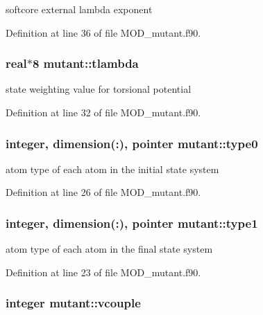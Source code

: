 softcore external lambda exponent 



Definition at line 36 of file M\-O\-D\-\_\-mutant.\-f90.

\hypertarget{classmutant_ad09b1660ee7cf2b19032e29646050709}{
\subsubsection[{tlambda}]{\setlength{\rightskip}{0pt plus 5cm}real$\ast$8 mutant\-::tlambda}}\label{classmutant_ad09b1660ee7cf2b19032e29646050709}


state weighting value for torsional potential 



Definition at line 32 of file M\-O\-D\-\_\-mutant.\-f90.

\hypertarget{classmutant_a6fc403c4284262ec13d260154dc672be}{
\subsubsection[{type0}]{\setlength{\rightskip}{0pt plus 5cm}integer, dimension(\-:), pointer mutant\-::type0}}\label{classmutant_a6fc403c4284262ec13d260154dc672be}


atom type of each atom in the initial state system 



Definition at line 26 of file M\-O\-D\-\_\-mutant.\-f90.

\hypertarget{classmutant_a32601bca144d0e52789fc6ea96a7767a}{
\subsubsection[{type1}]{\setlength{\rightskip}{0pt plus 5cm}integer, dimension(\-:), pointer mutant\-::type1}}\label{classmutant_a32601bca144d0e52789fc6ea96a7767a}


atom type of each atom in the final state system 



Definition at line 23 of file M\-O\-D\-\_\-mutant.\-f90.

\hypertarget{classmutant_a15145ccb3bf4a6c9120785ac8a2f42b0}{
\subsubsection[{vcouple}]{\setlength{\rightskip}{0pt plus 5cm}integer mutant\-::vcouple}}\label{classmutant_a15145ccb3bf4a6c9120785ac8a2f42b0}


